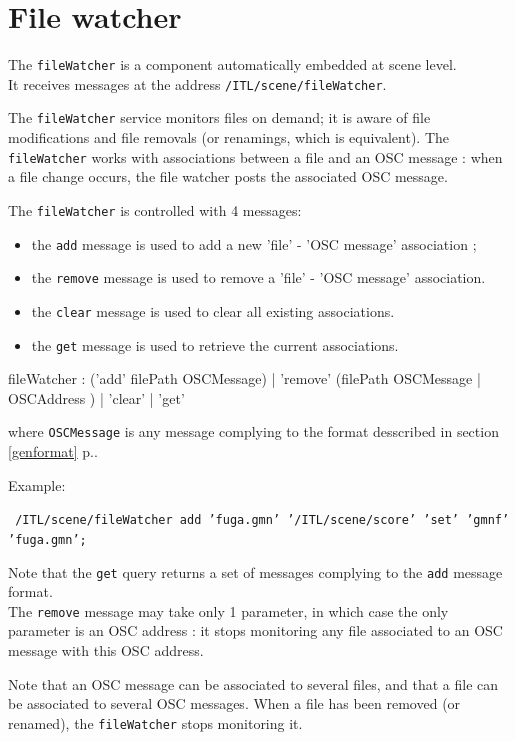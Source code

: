 \documentclass[a4paper,twoside]{report}
\newcommand{\sublevel}[1]	{\section{#1}}
\newcommand{\fullref}[1]	{\ref{#1} p.\pageref{#1}}
\newcommand{\OSC}[1]		{\texttt{#1}}
\newcommand{\sample}	[1]			{\begin{center}\colorbox{mygrey}{
								\begin{minipage}[t]{0.9\columnwidth} 
								{\small \texttt{#1}}
								\end{minipage}}\end{center}}
\begin{document}
\sublevel{File watcher}
\label{watch}

The \OSC{fileWatcher} is a component automatically embedded at scene level. \\
It receives messages at the address \OSC{/ITL/scene/fileWatcher}.

The \OSC{fileWatcher} service monitors files on demand; it is aware of file modifications and file removals (or renamings, which is equivalent). The \OSC{fileWatcher} works with associations between a file and an OSC message : when a file change occurs, the file watcher posts the associated OSC message.

The \OSC{fileWatcher} is controlled with 4 messages:
\begin{itemize}
\item the \OSC{add} message is used to add a new 'file' - 'OSC message' association ;
\item the \OSC{remove} message is used to remove a 'file' - 'OSC message' association.
\item the \OSC{clear} message is used to clear all existing associations.
\item the \OSC{get} message is used to retrieve the current associations.
\end{itemize}

\begin{rail}
fileWatcher : ('add' filePath OSCMessage) 
		| 'remove' (filePath OSCMessage | OSCAddress )
		| 'clear'
		| 'get'
\end{rail}

where \OSC{OSCMessage} is any message complying to the format desscribed in section \fullref{genformat}.

Example:
\sample{
/ITL/scene/fileWatcher add 'fuga.gmn' '/ITL/scene/score' 'set' 'gmnf' 'fuga.gmn';
}

Note that the \OSC{get} query returns a set of messages complying to the \OSC{add} message format.\\

The \OSC{remove} message may take only 1 parameter, in which case the only parameter is an OSC address : it stops monitoring any file associated to an OSC message with this OSC address.

Note that an OSC message can be associated to several files, and that a file can be associated to several OSC messages.
When a file has been removed (or renamed), the \OSC{fileWatcher} stops monitoring it.
\end{document}
